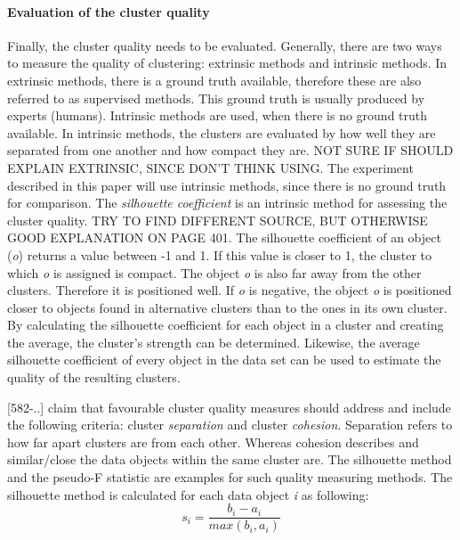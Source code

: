  \paragraph{Evaluation of the cluster quality}
  Finally, the cluster quality needs to be evaluated. Generally, there are two ways to measure the quality of clustering: extrinsic methods and intrinsic methods. In extrinsic methods, there is a ground truth available, therefore these are also referred to as supervised methods. This ground truth is usually produced by experts (humans). Intrinsic methods are used, when there is no ground truth available. In intrinsic methods, the clusters are evaluated by how well they are separated from one another and how compact they are.
  NOT SURE IF SHOULD EXPLAIN EXTRINSIC, SINCE DON'T THINK USING.
  The experiment described in this paper will use intrinsic methods, since there is no ground truth for comparison. The \textit{silhouette coefficient} is an intrinsic method for assessing the cluster quality. TRY TO FIND DIFFERENT SOURCE, BUT OTHERWISE GOOD EXPLANATION ON PAGE 401.
  The silhouette coefficient of an object (\textit{o})  returns a value between -1 and 1. If this value is closer to 1, the cluster to which \textit{o} is assigned is compact. The object \textit{o} is also far away from the other clusters. Therefore it is positioned well. If \textit{o} is negative, the object \textit{o} is positioned closer to objects found in alternative clusters than to the ones in its own cluster.
  By calculating the silhouette coefficient for each object in a cluster and creating the average, the cluster's strength can be determined. Likewise, the average silhouette coefficient of every object in the data set can be used to estimate the quality of the resulting clusters.


  \textcite{DataMiningAndPredictiveAnalytics}[582-..] claim that favourable cluster quality measures should address and include the following criteria: cluster \textit{separation} and cluster \textit{cohesion}. Separation refers to how far apart clusters are from each other. Whereas cohesion describes and similar/close the data objects within the same cluster are. The silhouette method and the pseudo-F statistic are examples for such quality measuring methods. The silhouette method is calculated for each data object \textit{i} as following:
  \[
    s_i = \frac{b_i - a_i}{max(b_i, a_i)}  
  \]

